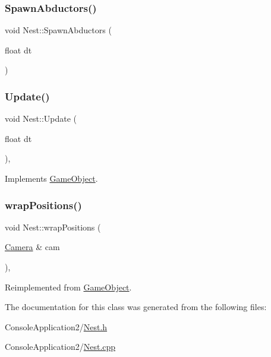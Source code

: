 \hypertarget{class_nest_a981ac754a770ac168f034cb139b7726b}{}\label{class_nest_a981ac754a770ac168f034cb139b7726b} 
\subsubsection{\texorpdfstring{Spawn\+Abductors()}{SpawnAbductors()}}
{\footnotesize\ttfamily void Nest\+::\+Spawn\+Abductors (\begin{DoxyParamCaption}\item[{float}]{dt }\end{DoxyParamCaption})}

\hypertarget{class_nest_a00bd75873d812a893b20b0391ca117b4}{}\label{class_nest_a00bd75873d812a893b20b0391ca117b4} 
\subsubsection{\texorpdfstring{Update()}{Update()}}
{\footnotesize\ttfamily void Nest\+::\+Update (\begin{DoxyParamCaption}\item[{float}]{dt }\end{DoxyParamCaption})\hspace{0.3cm}{\ttfamily [override]}, {\ttfamily [virtual]}}



Implements \hyperlink{class_game_object_a93ed63df640deb516a020530e7f8e045}{Game\+Object}.

\hypertarget{class_nest_a763db342ea691c22d37b4905c1d022fa}{}\label{class_nest_a763db342ea691c22d37b4905c1d022fa} 
\subsubsection{\texorpdfstring{wrap\+Positions()}{wrapPositions()}}
{\footnotesize\ttfamily void Nest\+::wrap\+Positions (\begin{DoxyParamCaption}\item[{\hyperlink{class_camera}{Camera} \&}]{cam }\end{DoxyParamCaption})\hspace{0.3cm}{\ttfamily [override]}, {\ttfamily [virtual]}}



Reimplemented from \hyperlink{class_game_object_a53b129d55688652e25e6515d80e669ca}{Game\+Object}.



The documentation for this class was generated from the following files\+:\begin{DoxyCompactItemize}
\item 
Console\+Application2/\hyperlink{_nest_8h}{Nest.\+h}\item 
Console\+Application2/\hyperlink{_nest_8cpp}{Nest.\+cpp}\end{DoxyCompactItemize}
